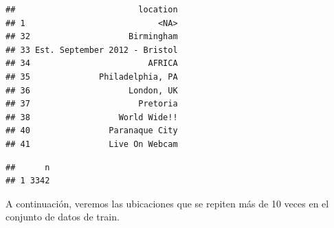 \documentclass[]{article}
\newenvironment{Shaded}{\begin{snugshade}}{\end{snugshade}}
\newcommand{\DecValTok}[1]{\textcolor[rgb]{0.00,0.00,0.81}{#1}}
\newcommand{\KeywordTok}[1]{\textcolor[rgb]{0.13,0.29,0.53}{\textbf{#1}}}
\newcommand{\NormalTok}[1]{#1}
\newcommand{\OperatorTok}[1]{\textcolor[rgb]{0.81,0.36,0.00}{\textbf{#1}}}
\newcommand{\StringTok}[1]{\textcolor[rgb]{0.31,0.60,0.02}{#1}}
\begin{document}
\begin{Shaded}
\end{Shaded}

\begin{verbatim}
##                         location
## 1                           <NA>
## 32                    Birmingham
## 33 Est. September 2012 - Bristol
## 34                        AFRICA
## 35              Philadelphia, PA
## 36                    London, UK
## 37                      Pretoria
## 38                  World Wide!!
## 40                Paranaque City
## 41                Live On Webcam
\end{verbatim}

\begin{Shaded}
\end{Shaded}

\begin{verbatim}
##      n
## 1 3342
\end{verbatim}

A continuación, veremos las ubicaciones que se repiten más de 10 veces
en el conjunto de datos de train.

\begin{Shaded}
\end{Shaded}
\end{document}
